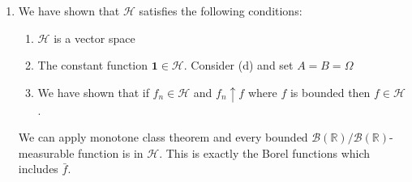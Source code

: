 \documentclass[12pt, letterpaper]{article}
\begin{document}
\begin{enumerate} [label = \textbf{\alph*)}]
	\item We have shown that $\mathcal{H}$ satisfies the following conditions: 
	\begin{enumerate} [label = \roman*)]
		\item $\mathcal{H}$ is a vector space
		\item The constant function $\textbf{1} \in \mathcal{H}$. Consider (d) and set $A = B = \Omega$
		\item We have shown that if $f_n \in \mathcal{H}$ and $f_n \uparrow f$ where $f$ is bounded then $f \in \mathcal{H}$.
		\end{enumerate}
		We can apply monotone class theorem and every bounded $\mathcal{B}(\mathbb{R})/\mathcal{B}(\mathbb{R})$-measurable function is in $\mathcal{H}$. This is exactly the Borel functions which includes $\bar{f}$.
	
\end{enumerate}		
\end{document}

